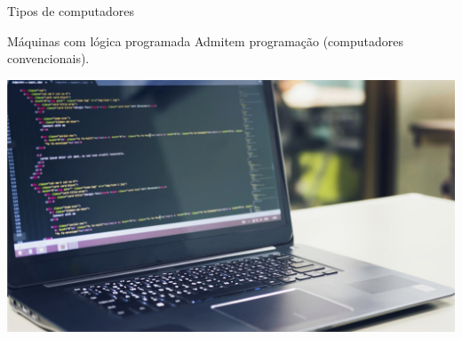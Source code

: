 \begin{frame}{Tipos de computadores}
	\begin{block}{Máquinas com lógica programada}
		Admitem programação (computadores convencionais).
	\end{block}

	\medskip

	\centering
	\includegraphics[width=0.9\linewidth]{Figuras/Ch01/fig11}
\end{frame}


